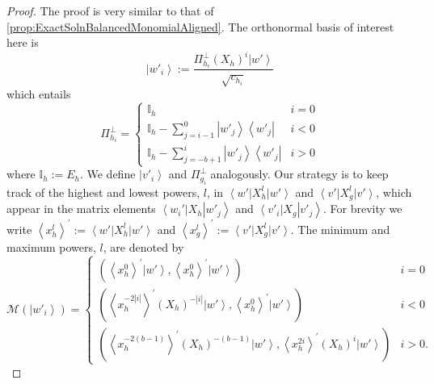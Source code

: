 \documentclass{article}
\begin{document}
\begin{proof}
  The proof is very similar to that of \cref{prop:ExactSolnBalancedMonomialAligned}.
  The orthonormal basis of interest here is
  \begin{displaymath}
    \left|w'_{i}\right\rangle :=\frac{\Pi_{h_{i}}^{\perp}(X_{h})^{i}\left|w'\right\rangle }{\sqrt{c_{h_{i}}}}
  \end{displaymath}
  which entails
  \begin{displaymath}
    \Pi_{h_{i}}^{\perp}=\begin{cases}
      \mathbb{I}_{h}                                                                       & i=0 \\
      \mathbb{I}_{h}-\sum_{j=i-1}^{0}\left|w'_{j}\right\rangle \left\langle w'_{j}\right|  & i<0 \\
      \mathbb{I}_{h}-\sum_{j=-b+1}^{i}\left|w'_{j}\right\rangle \left\langle w'_{j}\right| & i>0
    \end{cases}
  \end{displaymath}
  where $\mathbb{I}_{h}:=E_{h}$. We define $\left|v'_{i}\right\rangle $
  and $\Pi_{g_{i}}^{\perp}$ analogously. Our strategy is to keep track
  of the highest and lowest powers, $l$, in $\left\langle w'\right|X_{h}^{l}\left|w'\right\rangle $
  and $\left\langle v'\right|X_{g}^{l}\left|v'\right\rangle $, which
  appear in the matrix elements $\left\langle w_{i}'\right|X_{h}\left|w'_{j}\right\rangle $
  and $\left\langle v'_{i}\right|X_{g}\left|v'_{j}\right\rangle $.
  For brevity  we write $\left\langle x_{h}^{l}\right\rangle ^{\prime}:=\left\langle w'\right|X_{h}^{l}\left|w'\right\rangle $
  and $\left\langle x_{g}^{l}\right\rangle ^{\prime}:=\left\langle v'\right|X_{g}^{l}\left|v'\right\rangle $.
  The minimum and maximum powers, $l$, are denoted by
  \begin{displaymath}
    \mathcal{M}(\left|w'_{i}\right\rangle )=\begin{cases}
      \left(\left\langle x_{h}^{0}\right\rangle ^{\prime}\left|w'\right\rangle ,\left\langle x_{h}^{0}\right\rangle ^{\prime}\left|w'\right\rangle \right)                                         & i=0  \\
      \left(\left\langle x_{h}^{-2\left|i\right|}\right\rangle ^{\prime}(X_{h})^{-\left|i\right|}\left|w'\right\rangle ,\left\langle x_{h}^{0}\right\rangle ^{\prime}\left|w'\right\rangle \right) & i<0  \\
      \left(\left\langle x_{h}^{-2(b-1)}\right\rangle ^{\prime}(X_{h})^{-(b-1)}\left|w'\right\rangle ,\left\langle x_{h}^{2i}\right\rangle ^{\prime}(X_{h})^{i}\left|w'\right\rangle \right)       & i>0.

\end{cases}
\end{displaymath}
\end{proof}
\end{document}
